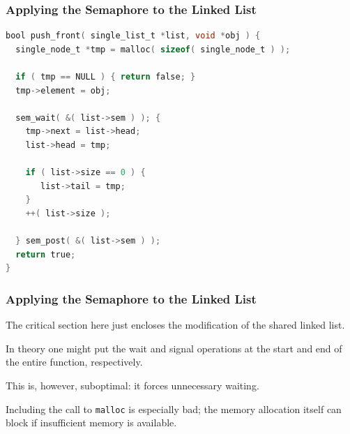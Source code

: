 \begin{frame}[fragile]
	\frametitle{Applying the Semaphore to the Linked List}

	\begin{lstlisting}[language=C]
bool push_front( single_list_t *list, void *obj ) {
  single_node_t *tmp = malloc( sizeof( single_node_t ) );
  
  if ( tmp == NULL ) { return false; }  
  tmp->element = obj;

  sem_wait( &( list->sem ) ); {  
    tmp->next = list->head;
    list->head = tmp;

    if ( list->size == 0 ) {
       list->tail = tmp;
    }
    ++( list->size );
  
  } sem_post( &( list->sem ) );
  return true;
}
\end{lstlisting}


\end{frame}

\begin{frame}
	\frametitle{Applying the Semaphore to the Linked List}

	The critical section here just encloses the modification of the shared linked list.

	In theory one might put the wait and signal operations at the start and end of the entire function, respectively.

	This is, however, suboptimal: it forces unnecessary waiting.

	Including the call to \texttt{malloc} is especially bad; the memory allocation itself can block if insufficient memory is available.

\end{frame}



